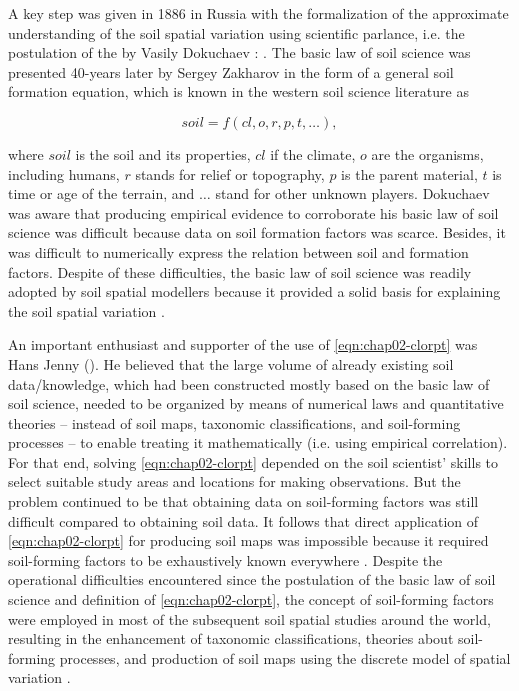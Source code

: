 A key step was given in 1886 in Russia with the formalization of the approximate understanding of the soil 
spatial variation using scientific parlance, i.e. the postulation of the  by 
Vasily Dokuchaev \cite{Florinsky2012}: . The basic law of soil science was presented 40-years later by Sergey Zakharov in the form of a 
general soil formation equation, which is known in the western soil science literature as \cite{Jenny1941, 
Florinsky2012}

\begin{equation}\label{eqn:chap02-clorpt}
 soil = f(cl, o, r, p, t, \ldots),
\end{equation}

\noindent where $soil$ is the soil and its properties, $cl$ if the climate, $o$ 
are the organisms, including humans, $r$ stands for relief or topography, $p$ is the 
parent material, $t$ is time or age of the terrain, and $\ldots$ stand for other unknown 
players. Dokuchaev was aware that producing empirical evidence to corroborate his basic law of soil science was 
difficult because data on soil formation factors was scarce. Besides, it was difficult to numerically express 
the relation between soil and formation factors. Despite of these difficulties, the basic law of soil science 
was readily adopted by soil spatial modellers because it provided a solid basis for explaining the soil spatial 
variation \cite{Smith1986}.

An important enthusiast and supporter of the use of \autoref{eqn:chap02-clorpt} was Hans Jenny 
(\citeyear{Jenny1941}). He believed that the large volume of already existing soil data/knowledge, which had 
been constructed mostly based on the basic law of soil science, needed to be organized by means of numerical 
laws and quantitative theories -- instead of soil maps, taxonomic classifications, and soil-forming processes 
-- to enable treating it mathematically (i.e. using empirical correlation). For that end, solving 
\autoref{eqn:chap02-clorpt} depended on the soil scientist' skills to select suitable study areas and locations 
for making observations. But the problem continued to be that obtaining data on soil-forming factors was still 
difficult compared to obtaining soil data. It follows that direct application of \autoref{eqn:chap02-clorpt} 
for producing soil maps was impossible because it required soil-forming factors to be exhaustively known 
everywhere \cite{Jenny1941}. Despite the operational difficulties encountered since the postulation of the 
basic law of soil science and definition of \autoref{eqn:chap02-clorpt}, the concept of soil-forming factors 
were employed in most of the subsequent soil spatial studies around the world, resulting in the enhancement of 
taxonomic classifications, theories about soil-forming processes, and production of soil maps using the 
discrete model of spatial variation \cite{Schelling1970, Hudson1992, BockheimEtAl2000, Legros2006, 
KrasilnikovEtAl2009b, HarteminkEtAl2013}.

